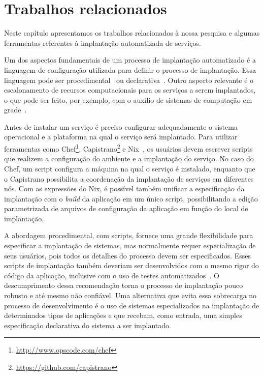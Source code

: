 
\chapter{Trabalhos relacionados}
\label{cap:relacionados}

Neste capítulo apresentamos os trabalhos relacionados à nossa pesquisa e algumas ferramentas 
referentes à implantação automatizada de serviços. 

Um dos aspectos fundamentais de um processo de implantação automatizado é a linguagem de configuração utilizada para definir o processo de implantação. Essa linguagem pode ser procedimental~\cite{Dolstra2005Configuration} ou declarativa~\cite{Magee1996Dynamic, Balter1998Olan}. Outro aspecto relevante é o escalonamento de recursos computacionais para os serviços a serem implantados, o que pode ser feito, por exemplo, com o auxílio de sistemas de computação em grade~\cite{Watson2006Dynasoar}.

Antes de instalar um serviço é preciso configurar adequadamente o sistema operacional e a plataforma na qual o serviço será implantado. Para utilizar ferramentas como Chef\footnote{\url{http://www.opscode.com/chef}}, Capistrano\footnote{\url{https://github.com/capistrano}} e Nix~\cite{Dolstra2005Configuration}, os usuários devem escrever scripts que realizem a configuração do ambiente e a implantação do serviço. No caso do Chef, um script configura a máquina na qual o serviço é instalado, enquanto que o Capistrano possibilita a coordenação da implantação de serviços em diferentes nós. Com as expressões do Nix, é possível também unificar a especificação da implantação com o \textit{build} da aplicação em um único script, possibilitando a edição parametrizada de arquivos de configuração da aplicação em função do local de implantação. 

A abordagem procedimental, com scripts, fornece uma grande 
flexibilidade para especificar a implantação de sistemas, 
mas normalmente requer especialização de seus usuários, 
pois todos os detalhes do processo devem ser especificados. 
Esses scripts de implantação também deveriam ser desenvolvidos com o mesmo rigor do código da aplicação, inclusive com o uso de testes automatizados~\cite{Humble2011Continuous}. O descumprimento dessa recomendação torna o processo de implantação pouco robusto e até mesmo não confiável. Uma alternativa que evita essa sobrecarga no processo de desenvolvimento é o uso de sistemas especializados na implantação de determinados tipos de aplicações e que recebam, como entrada, uma simples especificação declarativa do sistema a ser implantado.

